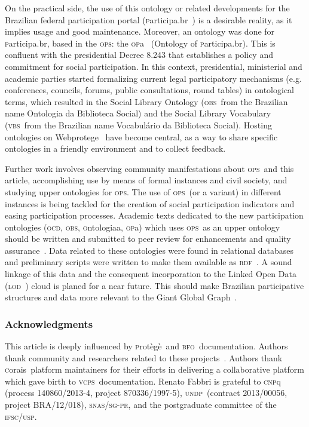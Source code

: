 \documentclass[10pt,letterpaper]{article}
\newcommand{\ops}{\textsc{ops}}
\newcommand{\vcps}{\textsc{vcps}}
\newcommand{\bfo}{\textsc{bfo}}
\newcommand{\opa}{\textsc{op}a}
\newcommand{\ocd}{\textsc{ocd}}
\newcommand{\ontologiaa}{\textsc{o}ntologiaa}
\newcommand{\obs}{\textsc{obs}}
\newcommand{\rdf}{\textsc{rdf}}
\newcommand{\participa}{\textsc{p}articipa.br}
\newcommand{\pnud}{\textsc{undp}}
\newcommand{\vbs}{\textsc{vbs}}
\newcommand{\lod}{\textsc{lod}}
\newcommand{\corais}{\textsc{c}orais}
\newcommand{\protege}{\textsc{p}rot\`eg\`e}
\begin{document}
On the practical side, the use of this ontology or related developments
for the Brazilian federal participation portal (\participa~\cite{participa}) is a desirable reality,
as it implies usage and good maintenance.
Moreover, an ontology was done for \participa, based in the \ops: the \opa~\cite{pnud5} (Ontology of \participa).
This is confluent with the presidential Decree 8.243 that establishes a policy and commitment for social participation\cite{decree}.
In this context, presidential, ministerial and academic parties started formalizing current
legal participatory mechanisms (e.g. conferences, councils, forums, public consultations, round tables)
in ontological terms, which resulted in the Social Library Ontology 
(\obs\ from the Brazilian name Ontologia da Biblioteca Social)
and the Social Library Vocabulary (\vbs\ from the Brazilian name Vocabul\'ario da Biblioteca Social).
Hosting ontologies on Webprotege~\cite{webprotege} have become central,
as a way to share specific ontologies in a friendly environment and to collect feedback.

Further work involves observing community manifestations about \ops\ and this article,
accomplishing use by means of formal instances and civil society,
and studying upper ontologies for \ops.
The use of \ops\ (or a variant) in different instances
is being tackled for the creation of social participation 
indicators and easing participation processes.
Academic texts dedicated to the new participation ontologies 
(\ocd, \obs, \ontologiaa, \opa) which uses \ops\ as an upper ontology
should be written and submitted to peer review for enhancements and quality assurance~\cite{pnud5}.
Data related to these ontologies were found in relational databases 
and preliminary scripts were written to make them available as \rdf~\cite{datahub}.
A sound linkage of this data and the consequent incorporation
to the Linked Open Data (\lod~\cite{lod}) cloud is planed for a near future.
This should make Brazilian participative structures and data more relevant to the Giant Global Graph~\cite{ggg}.

\subsubsection*{Acknowledgments}
This article is deeply influenced by \protege\ and \bfo\ documentation.
Authors thank community and researchers related to these projects~\cite{protege,bfo}.
Authors thank \corais\ platform maintainers for their efforts 
in delivering a collaborative platform which gave birth to \vcps\ documentation.
Renato Fabbri is grateful to \textsc{cnp}q (process 140860/2013-4, project 870336/1997-5),
\pnud\ (contract 2013/00056, project BRA/12/018), \textsc{snas/sg-pr},
and the postgraduate committee of the \textsc{ifsc/usp}.
\end{document}
